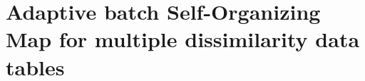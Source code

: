 \documentclass[10pt, conference, compsocconf]{IEEEtran}
\begin{document}
%
%
%
%
%


\section{Adaptive batch Self-Organizing Map for multiple dissimilarity data tables}\label{sec:adaptive_som}
\end{document}
